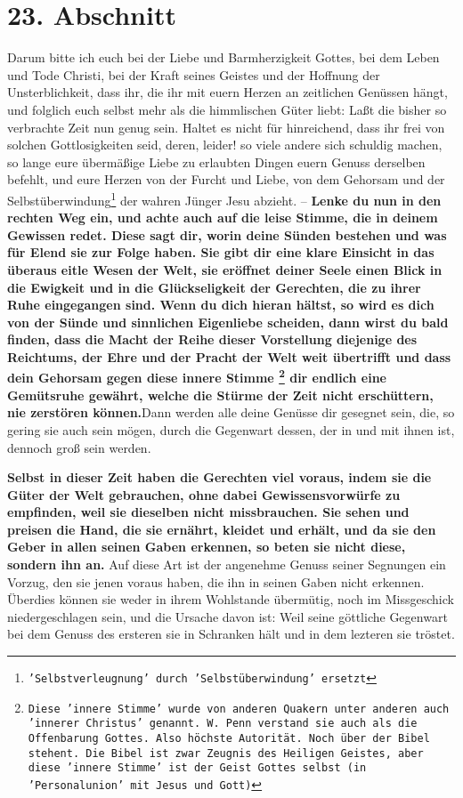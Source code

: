 \section{23. Abschnitt} \label{kap4_ab23}

\label{ref:04_23_innere_stimme}
Darum bitte ich euch bei der Liebe und Barmherzigkeit Gottes, bei dem Leben und
Tode Christi, bei der Kraft seines Geistes und der Hoffnung der Unsterblichkeit,
dass ihr, die ihr mit euern Herzen an zeitlichen Genüssen hängt, und folglich
euch selbst mehr als die himmlischen Güter liebt: Laßt die bisher so
verbrachte Zeit nun genug sein. Haltet es nicht für hinreichend, dass ihr frei
von solchen Gottlosigkeiten seid, deren, leider! so viele andere sich schuldig
machen, so lange eure übermäßige Liebe zu erlaubten Dingen euern Genuss
derselben
befehlt, und eure Herzen von der Furcht und Liebe, von dem Gehorsam und der
Selbstüberwindung\footnote{\texttt{'Selbstverleugnung' durch 'Selbstüberwindung'
ersetzt}} der wahren Jünger Jesu abzieht. -- \textbf{Lenke du nun in den
rechten Weg ein, und achte auch auf die leise Stimme, die in deinem Gewissen
redet.
Diese sagt dir, worin deine Sünden bestehen und was für Elend sie zur Folge
haben. Sie gibt dir eine klare Einsicht in das überaus eitle Wesen der Welt,
sie eröffnet deiner Seele einen Blick in die Ewigkeit und in die Glückseligkeit
der Gerechten, die zu ihrer Ruhe eingegangen sind. Wenn du dich hieran hältst,
so wird es dich von der Sünde und sinnlichen Eigenliebe scheiden, dann wirst du
bald finden, dass die Macht der Reihe dieser Vorstellung diejenige des
Reichtums, der Ehre und der Pracht der Welt weit übertrifft und dass dein
Gehorsam gegen diese innere Stimme \footnote{\texttt{Diese
'innere Stimme' wurde von anderen Quakern unter anderen
auch 'innerer Christus' genannt. W. Penn verstand sie auch als die Offenbarung
Gottes. Also höchste Autorität. Noch über der Bibel stehent. Die Bibel
ist zwar Zeugnis des Heiligen Geistes, aber diese 'innere Stimme' ist
der Geist Gottes selbst (in 'Personalunion' mit Jesus und Gott)}}
dir endlich eine Gemütsruhe gewährt, welche
die Stürme der Zeit nicht erschüttern, nie zerstören können.}Dann werden alle
deine Genüsse dir gesegnet sein, die, so gering sie auch sein mögen, durch die
Gegenwart dessen, der in und mit ihnen ist, dennoch groß sein werden.
\label{ref:04_23_innere_stimme_ende}

\medskip

\label{ref:04_23_dinge_der_welt}
\textbf{Selbst in dieser Zeit haben die Gerechten viel voraus, indem sie die
Güter der
Welt gebrauchen, ohne dabei Gewissensvorwürfe zu empfinden, weil sie dieselben
nicht missbrauchen. Sie sehen und preisen die Hand, die sie ernährt, kleidet und
erhält, und da sie den Geber in allen seinen Gaben erkennen, so beten sie nicht
diese, sondern ihn an.} Auf diese Art ist der angenehme Genuss seiner Segnungen
ein Vorzug, den sie jenen voraus haben, die ihn in seinen Gaben nicht
erkennen. Überdies können sie weder in ihrem Wohlstande übermütig, noch im
Missgeschick niedergeschlagen sein, und die Ursache davon ist: Weil seine
göttliche Gegenwart bei dem Genuss des ersteren sie in Schranken hält und in
dem lezteren sie tröstet.

